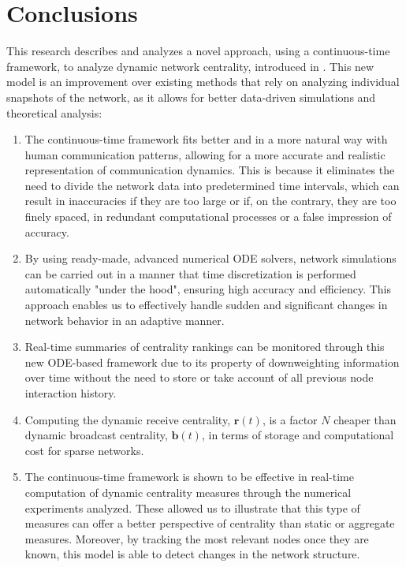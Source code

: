 
\chapter{Conclusions}
\label{chap:concl}

This research describes and analyzes a novel approach, using a continuous-time framework, to analyze dynamic network centrality, introduced in \cite{grindrod2014dynamical}. This new model is an improvement over existing methods that rely on analyzing individual snapshots of the network, as it allows for better data-driven simulations and theoretical analysis:

\begin{enumerate}[label=(\roman*)]
  \item The continuous-time framework fits better and in a more natural way with human communication patterns, allowing for a more accurate and realistic representation of communication dynamics. This is because it eliminates the need to divide the network data into predetermined time intervals, which can result in inaccuracies if they are too large or if, on the contrary, they are too finely spaced, in redundant computational processes or a false impression of accuracy.
  \item By using ready-made, advanced numerical ODE solvers, network simulations can be carried out in a manner that time discretization is performed automatically "under the hood", ensuring high accuracy and efficiency. This approach enables us to effectively handle sudden and significant changes in network behavior in an adaptive manner.
  \item Real-time summaries of centrality rankings can be monitored through this new ODE-based framework due to its property of downweighting information over time without the need to store or take account of all previous node interaction history.
  \item Computing the dynamic receive centrality, $\mathbf{r}(t)$, is a factor $N$ cheaper than dynamic broadcast centrality, $\mathbf{b}(t)$, in terms of storage and computational cost for sparse networks.
  \item The continuous-time framework is shown to be effective in real-time computation of dynamic centrality measures through the numerical experiments analyzed. These allowed us to illustrate that this type of measures can offer a better perspective of centrality than static or aggregate measures. Moreover, by tracking the most relevant nodes once they are known, this model is able to detect changes in the network structure.
\end{enumerate}






